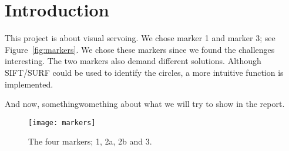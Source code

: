\section{Introduction}
This project is about visual servoing. We chose marker 1 and marker 3; see Figure~\vref{fig:markers}.
We chose these markers since we found the challenges interesting.
The two markers also demand different solutions.
Although SIFT/SURF could be used to identify the circles, a more intuitive function is implemented.

And now, somethingwomething about what we will try to show in the report.

\begin{figure}
\centering
\texttt{[image: markers]}
\caption{The four markers; 1, 2a, 2b and 3.}
\label{fig:markers}
\end{figure}
